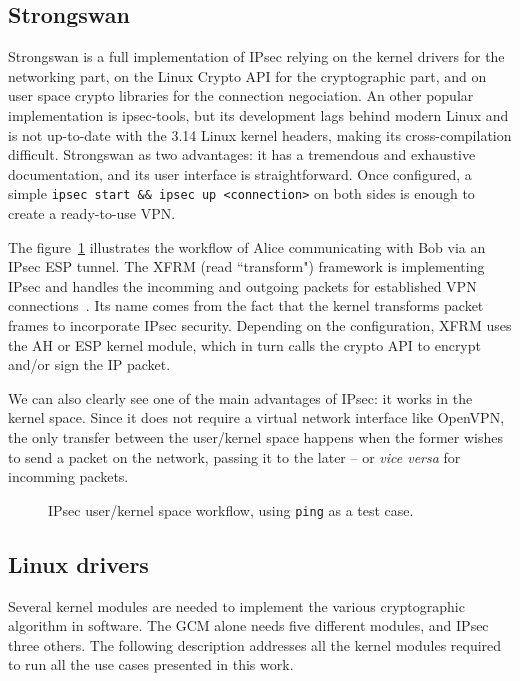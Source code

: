 \subsection{Strongswan}
Strongswan is a full implementation of IPsec relying on the kernel drivers for the networking part, on the Linux Crypto API for the cryptographic part, and on user space crypto libraries for the connection negociation.
An other popular implementation is ipsec-tools, but its development lags behind modern Linux and is not up-to-date with the 3.14 Linux kernel headers, making its cross-compilation difficult.
Strongswan as two advantages: it has a tremendous and exhaustive documentation, and its user interface is straightforward.
Once configured, a simple \texttt{ipsec start \&\& ipsec up <connection>} on both sides is enough to create a ready-to-use VPN.

The figure~\ref{fig:ipsec-workflow} illustrates the workflow of Alice communicating with Bob via an IPsec ESP tunnel.
The XFRM (read ``transform") framework is implementing IPsec and handles the incomming and outgoing packets for established VPN connections~\cite{rosen2014}.
Its name comes from the fact that the kernel transforms packet frames to incorporate IPsec security.
Depending on the configuration, XFRM uses the AH or ESP kernel module, which in turn calls the crypto API to encrypt and/or sign the IP packet.

We can also clearly see one of the main advantages of IPsec: it works in the kernel space.
Since it does not require a virtual network interface like OpenVPN, the only transfer between the user/kernel space happens when the former wishes to send a packet on the network, passing it to the later -- or \textit{vice versa} for incomming packets.

\begin{figure}[ht]
\Large
\resizebox{\linewidth}{!}{%

}
\caption{IPsec user/kernel space workflow, using \texttt{ping} as a test case.}{}
\label{fig:ipsec-workflow}
\end{figure}


\subsection{Linux drivers}
Several kernel modules are needed to implement the various cryptographic algorithm in software.
The GCM alone needs five different modules, and IPsec three others.
The following description addresses all the kernel modules required to run all the use cases presented in this work.


